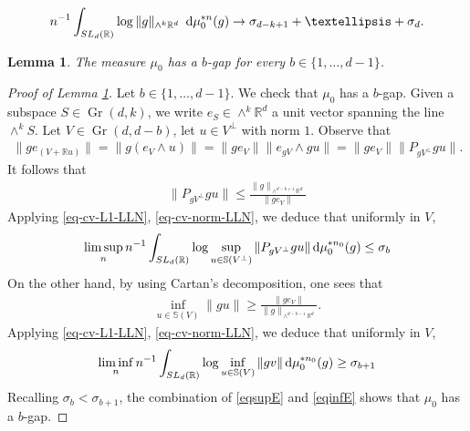 \documentclass[10pt,a4paper]{amsart}
\newtheorem{lemma}{Lemma}
\DeclareMathOperator{\Gr}{Gr}
\def \R{{\mathbb R}}
\def\S{ {\mathbb{S}} }
\def\SL{   {\rm SL}}
\newcommand{\dd}{\,\mathrm{d}}
\begin{document}
			\begin{align}\label{eq-cv-norm-LLN}
				n^{-1}\int_{\SL_{d}(\R)} \log \|g\|_{\wedge^{k}\R^d} \,\,\dd\mu_{0}^{*n}(g) \rightarrow \sigma_{d-k+1}+\dots +\sigma_{d}.
			\end{align}		

		\begin{lemma}  \label{lem mu0neighborhoodfine}
			The measure $\mu_{0}$ has a $b$-gap for every $b\in \{1, \dots, d-1\}$.
		\end{lemma}

		\begin{proof}[Proof of Lemma \ref{lem mu0neighborhoodfine}] 	
				Let $b\in \{1, \dots, d-1\}$. We check that $\mu_{0}$ has a $b$-gap. 		Given a subspace $S\in \Gr(d,k)$, we write $e_{S}	\in \wedge^{k}\R^d$ a unit vector spanning the line $\wedge^{k}S$.	Let $V\in \Gr(d, d-b)$, let $u\in V^\perp$ with norm $1$.  Observe that
			\begin{align*}
				\|g e_{(V+\R u)}\|= \|g (e_{V}\wedge u)\| =\|g e_{V}\| \|e_{gV}\wedge gu\|= \|g e_{V}\|\| P_{gV^{\perp}} gu  \|.
			\end{align*}
			It follows that					
			\begin{align}\label{eq-proj-rationorm}
				\| P_{gV^{\perp}} gu  \|\leq \frac{\|g\|_{\wedge^{d-b+1}\R^d}}{\|ge_{V}\|} 
			\end{align}
			Applying \eqref{eq-cv-L1-LLN}, \eqref{eq-cv-norm-LLN}, we deduce that uniformly in $V$, 
			\begin{align}\label{eqsupE}
				\limsup_{n} n^{-1}	\int_{\SL_{d}(\R)}  \log \sup_{u \in \S(V^{\perp})} \| P_{gV^{\perp}} gu  \|  \dd\mu_{0}^{* n_0}(g) 	 \leq  \sigma_{b}		
			\end{align}
			On the other hand, by using Cartan's decomposition, one sees that
			\begin{align}\label{eq-inf-rationorm}
				\inf_{u \in \S(V)} \| gu \| \geq \frac{\|g e_{V}\|}{\|g\|_{\wedge^{d-b-1}\R^d }}.		 
			\end{align}
			Applying \eqref{eq-cv-L1-LLN}, \eqref{eq-cv-norm-LLN}, we deduce that uniformly in $V$, 
			\begin{align}\label{eqinfE}
				\liminf_{n} n^{-1} \int_{\SL_{d}(\R)} \log \inf_{u \in \S(V)} \| g v \|   \dd\mu_{0}^{* n_0}(g) 		\geq \sigma_{b+1}		
			\end{align}
			Recalling $\sigma_{b}<\sigma_{b+1}$, the combination of \eqref{eqsupE} and \eqref{eqinfE} shows that $\mu_{0}$ has a $b$-gap.
			
			
		\end{proof}
\end{document}
